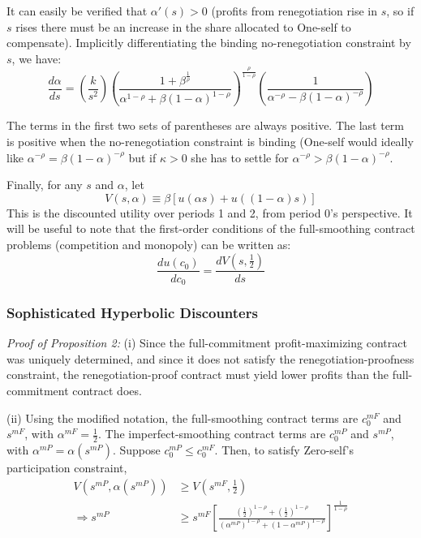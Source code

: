 \documentclass[11pt,english]{article}
\theoremstyle{plain}
\theoremstyle{definition}
\begin{document}
It can easily be verified that $\alpha'\left(s\right)>0$ (profits
from renegotiation rise in $s$, so if $s$ rises there must be an
increase in the share allocated to One-self to compensate). Implicitly
differentiating the binding no-renegotiation constraint by $s$, we
have: 
\begin{equation}
\frac{d\alpha}{ds}=\left(\frac{k}{s^{2}}\right)\left(\frac{1+\beta^{\frac{1}{\rho}}}{\alpha^{1-\rho}+\beta\left(1-\alpha\right)^{1-\rho}}\right)^{\frac{\rho}{1-\rho}}\left(\frac{1}{\alpha^{-\rho}-\beta\left(1-\alpha\right)^{-\rho}}\right)\label{eq:dalpha-ds}
\end{equation}

The terms in the first two sets of parentheses are always positive.
The last term is positive when the no-renegotiation constraint is
binding (One-self would ideally like $\alpha^{-\rho}=\beta\left(1-\alpha\right)^{-\rho}$
but if $\kappa>0$ she has to settle for $\alpha^{-\rho}>\beta\left(1-\alpha\right)^{-\rho}$.

Finally, for any $s$ and $\alpha$, let 
\begin{equation}
V\left(s,\alpha\right)\equiv\beta\left[u\left(\alpha s\right)+u\left(\left(1-\alpha\right)s\right)\right]\label{eq:cont-utility}
\end{equation}
This is the discounted utility over periods 1 and 2, from period 0's
perspective. It will be useful to note that the first-order conditions
of the full-smoothing contract problems (competition and monopoly)
can be written as: 
\begin{equation}
\frac{du\left(c_{0}\right)}{dc_{0}}=\frac{dV\left(s,\frac{1}{2}\right)}{ds}\label{eq:FOC-with-V}
\end{equation}


\subsubsection{Sophisticated Hyperbolic Discounters}

\textit{Proof of Proposition 2:} (i) Since the full-commitment profit-maximizing
contract was uniquely determined, and since it does not satisfy the
renegotiation-proofness constraint, the renegotiation-proof contract
must yield lower profits than the full-commitment contract does.

(ii) Using the modified notation, the full-smoothing contract terms
are $c_{0}^{mF}$ and $s^{mF}$, with $\alpha^{mF}=\frac{1}{2}$.
The imperfect-smoothing contract terms are $c_{0}^{mP}$ and $s^{mP}$,
with $\alpha^{mP}=\alpha\left(s^{mP}\right)$. Suppose $c_{0}^{mP}\leq c_{0}^{mF}$.
Then, to satisfy Zero-self's participation constraint, 
\begin{align}
V\left(s^{mP},\alpha\left(s^{mP}\right)\right) & \geq V\left(s^{mF},\frac{1}{2}\right)\\
\Rightarrow s^{mP} & \geq s^{mF}\left[\frac{\left(\frac{1}{2}\right)^{1-\rho}+\left(\frac{1}{2}\right)^{1-\rho}}{\left(\alpha^{mP}\right)^{1-\rho}+\left(1-\alpha^{mP}\right)^{1-\rho}}\right]^{\frac{1}{1-\rho}}\label{eq:s-compare}
\end{align}
\end{document}
